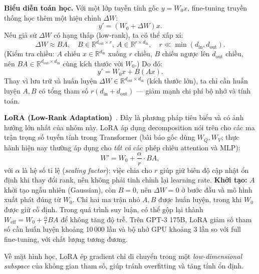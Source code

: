 \textbf{Biểu diễn toán học.}  
Với một lớp tuyến tính gốc $y = W_0 x$, fine-tuning truyền thống học thêm một hiệu chỉnh $\Delta W$:
\[
y' = (W_0 + \Delta W)x.
\]
Nếu giả sử $\Delta W$ có hạng thấp (low-rank), ta có thể xấp xỉ:
\[
\Delta W \approx B A, \quad B \in \mathbb{R}^{d_{\text{out}} \times r}, \ A \in \mathbb{R}^{r \times d_{\text{in}}}, \quad r \ll \min(d_{\text{in}}, d_{\text{out}}).
\]
(Kiểm tra chiều: $A$ chiếu $x \in \mathbb{R}^{d_{\text{in}}}$ xuống $r$ chiều, $B$ chiếu ngược lên $d_{\text{out}}$ chiều, nên $BA \in \mathbb{R}^{d_{\text{out}} \times d_{\text{in}}}$ cùng kích thước với $W_0$.) Do đó:
\[
y' = W_0 x + B (A x).
\]
Thay vì lưu trữ và huấn luyện $\Delta W \in \mathbb{R}^{d_{\text{out}} \times d_{\text{in}}}$ (kích thước lớn), ta chỉ cần huấn luyện $A,B$ có tổng tham số $r(d_{\text{in}} + d_{\text{out}})$ — giảm mạnh chi phí bộ nhớ và tính toán.

\textbf{LoRA (Low-Rank Adaptation)}~\cite{hu2021lora}.
Đây là phương pháp tiêu biểu và có ảnh hưởng lớn nhất của nhóm này.
LoRA áp dụng decomposition nói trên cho các ma trận trọng số tuyến tính trong Transformer (bài báo gốc dùng $W_Q, W_V$; thực hành hiện nay thường áp dụng cho \emph{tất cả} các phép chiếu attention và MLP):
\[
W' = W_0 + \frac{\alpha}{r} \cdot B A,
\]
với $\alpha$ là hệ số tỉ lệ (\textit{scaling factor}); việc chia cho $r$ giúp giữ biên độ cập nhật ổn định khi thay đổi rank, nên không phải tinh chỉnh lại learning rate.
\textbf{Khởi tạo:} $A$ khởi tạo ngẫu nhiên (Gaussian), còn $B = 0$, nên $\Delta W = 0$ ở bước đầu và mô hình xuất phát đúng từ $W_0$.
Chỉ hai ma trận nhỏ $A, B$ được huấn luyện, trong khi $W_0$ được giữ cố định.
Trong quá trình suy luận, có thể gộp lại thành $W_{\text{eff}} = W_0 + \frac{\alpha}{r}BA$ để không tăng độ trễ.
Trên GPT-3 175B, LoRA giảm số tham số cần huấn luyện khoảng 10\,000 lần và bộ nhớ GPU khoảng 3 lần so với full fine-tuning, với chất lượng tương đương.

Về mặt hình học, LoRA ép gradient chỉ di chuyển trong một \textit{low-dimensional subspace} của không gian tham số, giúp tránh overfitting và tăng tính ổn định.

